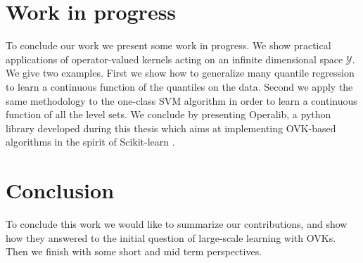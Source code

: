 
\chapter{Work in progress}
\label{ch:Perspectives}
\bigskip
\begin{justify}
    To conclude our work we present some work in progress. We show practical
    applications of operator-valued kernels acting on an infinite dimensional
    space $\mathcal{Y}$. We give two examples. First we show how to generalize
    many quantile regression to learn a continuous function of the quantiles on
    the data. Second we apply the same methodology to the one-class SVM
    algorithm in order to learn a continuous function of all the level sets. We
    conclude by presenting Operalib, a python library developed during this
    thesis which aims at implementing \acs{OVK}-based algorithms in the spirit
    of Scikit-learn \citep{pedregosa2011scikit}.
\end{justify}
\minitoc




\chapter{Conclusion}
\bigskip
\begin{justify}
    To conclude this work we would like to summarize our contributions, and
    show how they answered to the initial question of large-scale learning with
    \aclp{OVK}. Then we finish with some short and mid term perspectives.
\end{justify}
\minitoc
\label{ch:conclusion}

